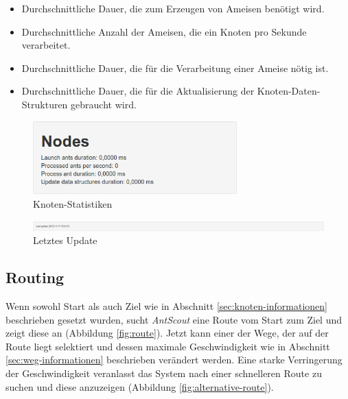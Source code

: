 \begin{itemize}
  \item Durchschnittliche Dauer, die zum Erzeugen von Ameisen benötigt wird.
  \item Durchschnittliche Anzahl der Ameisen, die ein Knoten pro Sekunde verarbeitet.
  \item Durchschnittliche Dauer, die für die Verarbeitung einer Ameise nötig ist.
  \item Durchschnittliche Dauer, die für die Aktualisierung der Knoten-Daten-Strukturen gebraucht wird.
\end{itemize}

\begin{figure}[htbp]
  \centering
  \includegraphics[width=0.7\textwidth]{Bilder/Knoten-Statistiken.png}
  \caption{Knoten-Statistiken}
  \label{fig:knoten-statistiken}
\end{figure}

\begin{figure}[htbp]
  \centering
  \includegraphics[width=\textwidth]{Bilder/Letztes-Update.png}
  \caption{Letztes Update}
  \label{fig:letztes-update}
\end{figure}

\subsection{Routing}
\label{sec:routing}

Wenn sowohl Start als auch Ziel wie in Abschnitt \ref{sec:knoten-informationen} beschrieben gesetzt wurden, sucht \textit{AntScout} eine Route vom Start zum Ziel und zeigt diese an (Abbildung \ref{fig:route}).
Jetzt kann einer der Wege, der auf der Route liegt selektiert und dessen maximale Geschwindigkeit wie in Abschnitt \ref{sec:weg-informationen} beschrieben verändert werden.
Eine starke Verringerung der Geschwindigkeit veranlasst das System nach einer schnelleren Route zu suchen und diese anzuzeigen (Abbildung \ref{fig:alternative-route}).

